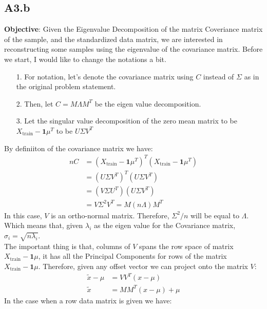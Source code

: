 \documentclass[]{article}
\begin{document}
    \subsection*{A3.b}
        \textbf{Objective}: Given the Eigenvalue Decomposition of the matrix Coveriance matrix of the sample, and the standardized data matrix, we are interested in reconstructing some samples using the eigenvalue of the covariance matrix. Before we start, I would like to change the notations a bit. 
        \begin{enumerate}
            \item[1.] For notation, let's denote the covariance matrix using $C$ instead of $\Sigma$ as in the original problem statement. 
            \item[2.] Then, let $C = M\Lambda M^T$ be the eigen value decomposition. 
            \item[3.] Let the singular value decomposition of the zero mean matrix to be $X_\text{train} - \mathbf{1}\mu^T$ to be $U\Sigma V^T$ 
        \end{enumerate}
        By definiiton of the covariance matrix we have:
        \begin{align*}\tag{A3.b.1}\label{eqn:A3.b.1}
            nC &= (X_\text{train} - \mathbf{1}\mu^T)^T(X_\text{train} - \mathbf{1}\mu^T)
            \\
            &= (U\Sigma V^T)^T(U\Sigma V^T)
            \\
            &= (V\Sigma U^T)(U\Sigma V^T)
            \\
            &= V\Sigma^2V^T = M(n\Lambda) M^T
        \end{align*}
        In this case, $V$ is an ortho-normal matrix. Therefore, $\Sigma^2/n$ will be equal to $\Lambda$. Which means that, given $\lambda_i$ as the eigen value for the Covariance matrix, $\sigma_i = \sqrt{n\lambda_i}$. 
        \\[1.1em]
        The important thing is that, columns of $V$ spans the row space of matrix $X_\text{train} - \mathbf{1}\mu$, it has all the Principal Components for rows of the matrix $X_\text{train} - \mathbf{1}\mu$. Therefore, given any offset vector we can project onto the matrix $V$: 
        \begin{align*}\tag{A3.b.2}\label{eqn:A3.b.2}
            \tilde{x} - \mu &= VV^T(x - \mu)
            \\
            \tilde{x} &= MM^T(x - \mu) + \mu
        \end{align*}
        In the case when a row data matrix is given we have: 
\end{document}
